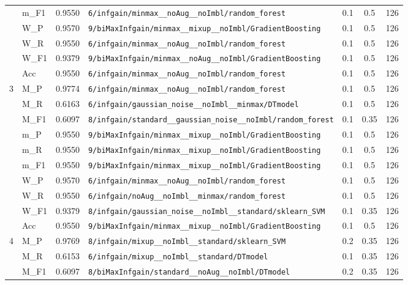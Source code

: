 \begin{table}[htbp]
\begin{tabular}{|c|l|c|>{\ttfamily\footnotesize}p{7.2cm}|c|c|c|}
 & m\_F1 & 0.9550 & \texttt{6/infgain/minmax\_\_noAug\_\_noImbl/random\_forest} & 0.1 & 0.5  & 126 \\ 
 & W\_P & 0.9570 & \texttt{9/biMaxInfgain/minmax\_\_mixup\_\_noImbl/GradientBoosting} & 0.1 & 0.5  & 126 \\ 
 & W\_R & 0.9550 & \texttt{6/infgain/minmax\_\_noAug\_\_noImbl/random\_forest} & 0.1 & 0.5  & 126 \\ 
 & W\_F1 & 0.9379 & \texttt{9/biMaxInfgain/minmax\_\_noAug\_\_noImbl/GradientBoosting} & 0.1 & 0.5  & 126 \\ 
 & Acc & 0.9550 & \texttt{6/infgain/minmax\_\_noAug\_\_noImbl/random\_forest} & 0.1 & 0.5  & 126 \\ 
\hline
\multirow{10}{*}{3} & M\_P & 0.9774 & \texttt{6/infgain/minmax\_\_noAug\_\_noImbl/random\_forest} & 0.1 & 0.5  & 126 \\ 
 & M\_R & 0.6163 & \texttt{6/infgain/gaussian\_noise\_\_noImbl\_\_minmax/DTmodel} & 0.1 & 0.5  & 126 \\ 
 & M\_F1 & 0.6097 & \texttt{8/infgain/standard\_\_gaussian\_noise\_\_noImbl/random\_forest} & 0.1 & 0.35  & 126 \\ 
 & m\_P & 0.9550 & \texttt{9/biMaxInfgain/minmax\_\_mixup\_\_noImbl/GradientBoosting} & 0.1 & 0.5  & 126 \\ 
 & m\_R & 0.9550 & \texttt{9/biMaxInfgain/minmax\_\_mixup\_\_noImbl/GradientBoosting} & 0.1 & 0.5  & 126 \\ 
 & m\_F1 & 0.9550 & \texttt{9/biMaxInfgain/minmax\_\_mixup\_\_noImbl/GradientBoosting} & 0.1 & 0.5  & 126 \\ 
 & W\_P & 0.9570 & \texttt{6/infgain/minmax\_\_noAug\_\_noImbl/random\_forest} & 0.1 & 0.5  & 126 \\ 
 & W\_R & 0.9550 & \texttt{6/infgain/noAug\_\_noImbl\_\_minmax/random\_forest} & 0.1 & 0.5  & 126 \\ 
 & W\_F1 & 0.9379 & \texttt{8/infgain/gaussian\_noise\_\_noImbl\_\_standard/sklearn\_SVM} & 0.1 & 0.35  & 126 \\ 
 & Acc & 0.9550 & \texttt{9/biMaxInfgain/minmax\_\_mixup\_\_noImbl/GradientBoosting} & 0.1 & 0.5  & 126 \\ 
\hline
\multirow{10}{*}{4} & M\_P & 0.9769 & \texttt{8/infgain/mixup\_\_noImbl\_\_standard/sklearn\_SVM} & 0.2 & 0.35  & 126 \\ 
 & M\_R & 0.6153 & \texttt{6/infgain/mixup\_\_noImbl\_\_standard/DTmodel} & 0.1 & 0.35  & 126 \\ 
 & M\_F1 & 0.6097 & \texttt{8/biMaxInfgain/standard\_\_noAug\_\_noImbl/DTmodel} & 0.2 & 0.35  & 126 \\ 

\end{tabular}
\end{table}
